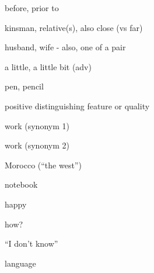 \begin{flashcard}{\LARGE before, prior to}
\LARGE {}
\end{flashcard}
\begin{flashcard}{\LARGE kinsman, relative(s), also close (vs far)}
\LARGE {}
\end{flashcard}
\begin{flashcard}{\LARGE husband, wife - also, one of a pair}
\LARGE {}
\end{flashcard}
\begin{flashcard}{\LARGE a little, a little bit (adv)}
\LARGE {}
\end{flashcard}
\begin{flashcard}{\LARGE pen, pencil}
\LARGE {}
\end{flashcard}
\begin{flashcard}{\LARGE positive distinguishing feature or quality}
\LARGE {}
\end{flashcard}
\begin{flashcard}{\LARGE work (synonym 1)}
\LARGE {}
\end{flashcard}
\begin{flashcard}{\LARGE work (synonym 2)}
\LARGE {}
\end{flashcard}
\begin{flashcard}{\LARGE Morocco (``the west'')}
\LARGE {}
\end{flashcard}
\begin{flashcard}{\LARGE notebook}
\LARGE {}
\end{flashcard}
\begin{flashcard}{\LARGE happy}
\LARGE {}
\end{flashcard}
\begin{flashcard}{\LARGE how?}
\LARGE {}
\end{flashcard}
\begin{flashcard}{\LARGE ``I don't know''}
\LARGE {}
\end{flashcard}
\begin{flashcard}{\LARGE language}
\LARGE {}
\end{flashcard}
